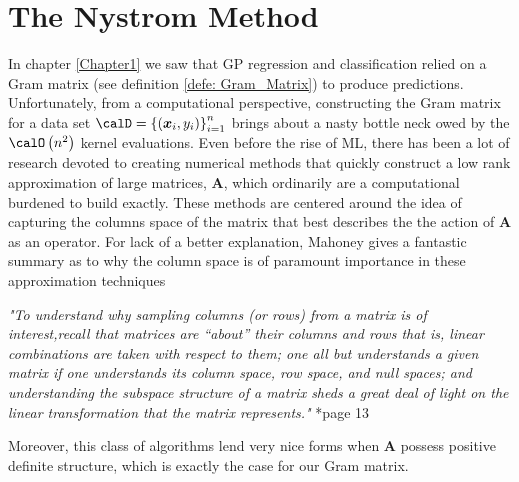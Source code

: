 \section{The Nystrom Method}\label{Chapter2}
In chapter \ref{Chapter1} we saw that GP regression and classification relied on a Gram matrix (see definition \ref{defe: Gram_Matrix}) to produce predictions. Unfortunately, from a computational perspective, constructing the Gram matrix for a data set $\calD = \left\{ \left( \bm{x}_i , y_{i} \right) \right\}_{i=1}^{n}$ brings about a nasty bottle neck owed by the $\calO \left( n^2 \right)$ kernel evaluations. Even before the rise of ML, there has been a lot of research devoted to creating numerical methods that quickly construct a low rank approximation of large matrices, $\bm{A}$, which ordinarily are a computational burdened to build exactly. These methods are centered around the idea of capturing the columns space of the matrix that best describes the the action of $\bm{A}$ as an operator. For lack of a better explanation, Mahoney gives a fantastic summary as to why the column space is of paramount importance in these approximation techniques
\begin{center}
    \emph{"To understand why sampling columns (or rows) from a matrix is of interest,recall that matrices are “about” their columns and rows that is, linear combinations are taken with respect to them; one all but understands a given matrix if one understands its column space, row space, and null
        spaces; and understanding the subspace structure of a matrix sheds a great deal of light on the linear transformation that the matrix represents."} \cite{DBLP:journals/corr/abs-1104-5557}*{page 13}
\end{center}
Moreover, this class of algorithms lend very nice forms when $\bm{A}$ possess positive definite structure, which is exactly the case for our Gram matrix.



